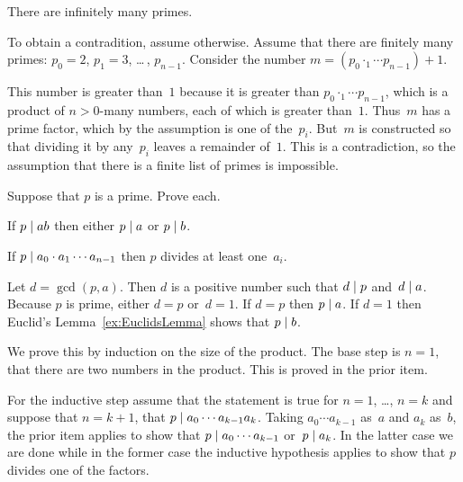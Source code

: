 \documentclass{ibl}
\begin{document}
\begin{ex}
There are infinitely many primes.  
\begin{ans}
To obtain a contradition, assume otherwise.
Assume that there are finitely many primes: 
$p_0=2$, $p_1=3$, \ldots\,, $p_{n-1}$.
Consider the number $m=(p_0\cdotp_1\cdots p_{n-1})+1$.

This number is greater than~$1$ because it is greater than 
$p_0\cdotp_1\cdots p_{n-1}$, 
which is a product of $n>0$-many numbers, each of which is greater than~$1$.
Thus~$m$ has a prime factor, which by the assumption is one of the~$p_i$.
But~$m$ is constructed so that dividing it by any~$p_i$ 
leaves a remainder of~$1$.
This is a contradiction, so the assumption that there is a finite
list of primes is impossible.
\end{ans}
\end{ex}

\begin{ex} Suppose that $p$ is a prime.  Prove each.\label{ex:EuclidsOtherLemma}
\begin{exes}
\item If  $p\mid ab$ then either $p\mid a$ or
$p\mid b$.
\item If $p\mid a_0\cdot a_1\cdots a_{n-1}$ then 
$p$ divides at least one~$a_i$.    
\end{exes}
\begin{ans}
\begin{exes}
\item Let $d=\gcd(p,a)$.
  Then $d$ is a positive number such that $d\mid p$ and~$d\mid a$.
  Because $p$ is prime, either $d=p$ or~$d=1$.
  If $d=p$ then $p\mid a$.
  If $d=1$ then Euclid's Lemma~\ref{ex:EuclidsLemma} shows that 
  $p\mid b$.
\item We prove this by induction on the size of the product.
  The base step is $n=1$, that there are two numbers in the product.
  This is proved in the prior item.

  For the inductive step assume that the statement is true for $n=1$, \ldots,
  $n=k$ and suppose that $n=k+1$, that $p\mid a_0\cdots a_{k-1}a_k$.
  Taking $a_0\cdots a_{k-1}$ as~$a$ and $a_k$ as~$b$, the prior item applies
  to show that $p\mid a_0\cdots a_{k-1}$ or~$p\mid a_k$.
  In the latter case we are done while in the former case the
  inductive hypothesis applies to show that $p$ divides one of the factors.
\end{exes}
\end{ans}
\end{ex}
\end{document}

